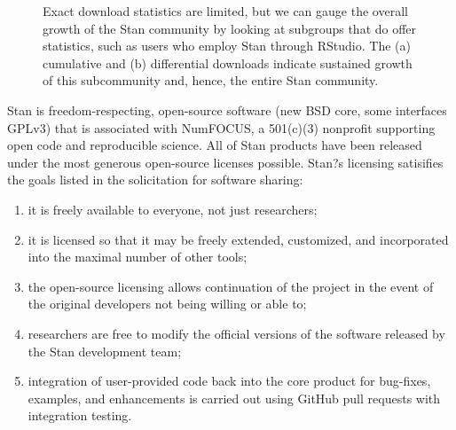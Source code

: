 \documentclass[12pt, oneside]{article}
\begin{document}
\begin{figure}
\centering
{}
\caption{Exact download statistics are limited, but we can gauge the overall
growth of the Stan community by looking at subgroups that do offer statistics,
such as users who employ Stan through RStudio.  The (a) cumulative and (b)
differential downloads indicate sustained growth of this subcommunity and,
hence, the entire Stan community.
}
\label{fig:rstan_stats}
\end{figure}

Stan is freedom-respecting, open-source software (new BSD core, some interfaces GPLv3)
that is associated with NumFOCUS, a 501(c)(3) nonprofit supporting open code and 
reproducible science.  All of Stan products have been released under the most generous 
open-source licenses possible. Stan?s licensing satisifies the goals listed in the solicitation for 
software sharing:

\begin{enumerate}
\item it is freely available to everyone, not just researchers;
\item it is licensed so that it may be freely extended, customized, and incorporated into 
         the maximal number of other tools;
\item the open-source licensing allows continuation of the project in the event of the original 
         developers not being willing or able to;
\item researchers are free to modify the official versions of the software released by the Stan 
         development team;
\item integration of user-provided code back into the core product for bug-fixes, examples, and 
         enhancements is carried out using GitHub pull requests with integration testing.
\end{enumerate}
\end{document}
